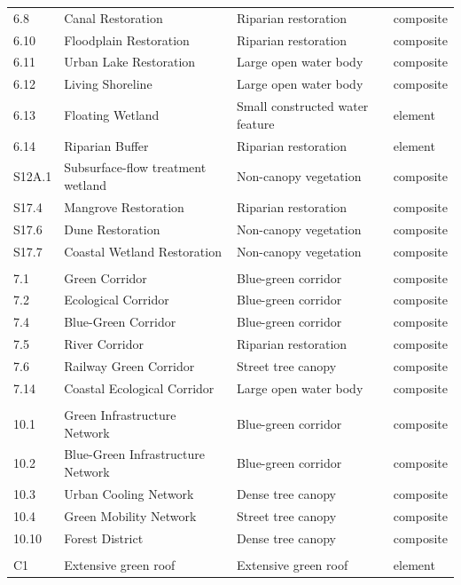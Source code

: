 {\begin{longtable}{@{}l>{\raggedright\arraybackslash}p{52mm}
                    >{\raggedright\arraybackslash}p{42mm}l@{}}
6.8 & Canal Restoration & Riparian restoration & composite \\
6.10 & Floodplain Restoration & Riparian restoration & composite \\
6.11 & Urban Lake Restoration & Large open water body & composite \\
6.12 & Living Shoreline & Large open water body & composite \\
6.13 & Floating Wetland & Small constructed water feature & element \\
6.14 & Riparian Buffer & Riparian restoration & element \\
S12A.1 & Subsurface-flow treatment wetland & Non-canopy vegetation & composite \\
S17.4 & Mangrove Restoration & Riparian restoration & composite \\
S17.6 & Dune Restoration & Non-canopy vegetation & composite \\
S17.7 & Coastal Wetland Restoration & Non-canopy vegetation & composite \\
\addlinespace
\multicolumn{4}{@{}l}{\textit{Ecological network} (6)}\\
7.1 & Green Corridor & Blue-green corridor & composite \\
7.2 & Ecological Corridor & Blue-green corridor & composite \\
7.4 & Blue-Green Corridor & Blue-green corridor & composite \\
7.5 & River Corridor & Riparian restoration & composite \\
7.6 & Railway Green Corridor & Street tree canopy & composite \\
7.14 & Coastal Ecological Corridor & Large open water body & composite \\
\addlinespace
\multicolumn{4}{@{}l}{\textit{District} (5)}\\
10.1 & Green Infrastructure Network & Blue-green corridor & composite \\
10.2 & Blue-Green Infrastructure Network & Blue-green corridor & composite \\
10.3 & Urban Cooling Network & Dense tree canopy & composite \\
10.4 & Green Mobility Network & Street tree canopy & composite \\
10.10 & Forest District & Dense tree canopy & composite \\
\addlinespace
\multicolumn{4}{@{}l}{\textit{Green roof} (12)}\\
C1 & Extensive green roof & Extensive green roof & element \\

\end{longtable}}
